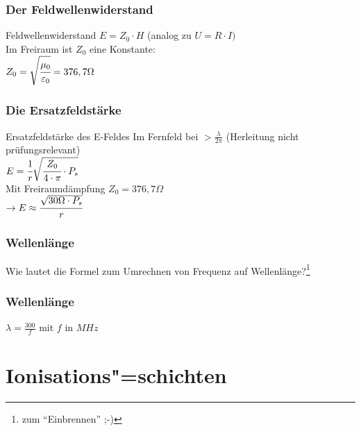 \begin{frame}
  \frametitle{Der Feldwellenwiderstand}
  \begin{block}{Feldwellenwiderstand}
    $E = Z_0 \cdot H$ \hspace{2cm} (analog zu $U = R \cdot I)$ \\[1em]
    Im Freiraum ist $Z_0$ eine Konstante: \\[1em]
    $Z_0 = \sqrt{\cfrac{\mu_0}{\varepsilon_0}} = 376,7 \Omega$ \\[1em]
  \end{block}
\end{frame}

\begin{frame}
  \frametitle{Die Ersatzfeldstärke}
  \begin{block}{Ersatzfeldstärke des E-Feldes}
    Im Fernfeld bei $> \frac{\lambda}{2\pi}$ (Herleitung nicht prüfungsrelevant)\\[1em]
    $E = \cfrac{1}{r} \sqrt{\cfrac{Z_0}{4 \cdot \pi} \cdot P_s}$ \\[1em]
    Mit Freiraumdämpfung $Z_0 = 376,7 \Omega $\\[1em]
    $\rightarrow E \approx \cfrac{\sqrt{30 \Omega \cdot P_s}}{r} $ \\[1em]
  \end{block}
\end{frame}


\begin{frame}
  \frametitle{Wellenlänge}
  \begin{center}
    \huge Wie lautet die Formel zum Umrechnen von Frequenz auf
    Wellenlänge?\footnote{zum ``Einbrennen'' ;-)}
  \end{center}
\end{frame}

\begin{frame}
  \frametitle{Wellenlänge}
  \begin{center}
    \huge $\lambda = \frac{300}{f}$ mit $f$ in $MHz$
  \end{center}
\end{frame}

\section*{Ionisations"=schichten}

